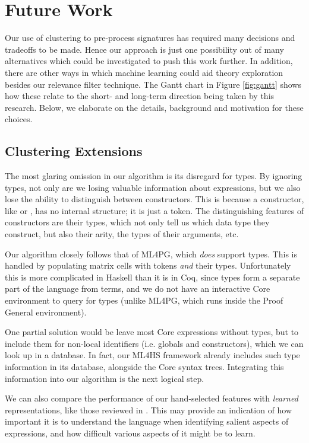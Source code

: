 \section{Future Work}
\label{sec:future}

Our use of clustering to pre-process \qspec{} signatures has required many decisions and tradeoffs to be made. Hence our approach is just one possibility out of many alternatives which could be investigated to push this work further. In addition, there are other ways in which machine learning could aid theory exploration besides our relevance filter technique. The Gantt chart in Figure \ref{fig:gantt} shows how these relate to the short- and long-term direction being taken by this research. Below, we elaborate on the details, background and motivation for these choices.

\subsection{Clustering Extensions}
\label{sec:preprocessing}

The most glaring omission in our algorithm is its disregard for types. By ignoring types, not only are we losing valuable information about expressions, but we also lose the ability to distinguish between constructors. This is because a constructor, like  or , has no internal structure; it is just a token. The distinguishing features of constructors are their types, which not only tell us which data type they construct, but also their arity, the types of their arguments, etc.

Our algorithm closely follows that of ML4PG, which \emph{does} support types. This is handled by populating matrix cells with tokens \emph{and} their types. Unfortunately this is more complicated in Haskell than it is in Coq, since types form a separate part of the language from terms, and we do not have an interactive Core environment to query for types (unlike ML4PG, which runs inside the Proof General environment).

One partial solution would be leave most Core expressions without types, but to include them for non-local identifiers (i.e. globals and constructors), which we can look up in a database. In fact, our ML4HS framework already includes such type information in its database, alongside the Core syntax trees. Integrating this information into our algorithm is the next logical step.

We can also compare the performance of our hand-selected features with \emph{learned} representations, like those reviewed in \citep{bengio2013representation}. This may provide an indication of how important it is to understand the language when identifying salient aspects of expressions, and how difficult various aspects of it might be to learn.

